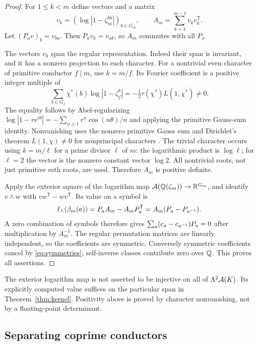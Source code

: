 \begin{proof}
For $1\le k<m$ define vectors and a matrix
\[
 v_k=(\log|1-\zeta_m^{bk}|)_{b\in G_m},
 \qquad A_m=\sum_{k=1}^{m-1}v_kv_k^{\mathsf T}.
\]
Let $(P_av)_b=v_{ba}$. Then $P_av_k=v_{ak}$, so $A_m$ commutes with
all $P_a$.

The vectors $v_k$ span the regular representation. Indeed their span
is invariant, and it has a nonzero projection to each character. For a
nontrivial even character of primitive conductor $f\mid m$, use
$k=m/f$. Its Fourier coefficient is a positive integer multiple of
\[
 \sum_{b\in G_f}\chi^*(b)\log|1-\zeta_f^b|
 =-\tfrac12\tau(\chi^*)L(1,\overline{\chi^*})\ne0.
\]
The equality follows by Abel-regularizing
$\log|1-r e^{i\theta}|=-\sum_{n\ge1}r^n\cos(n\theta)/n$ and applying
the primitive Gauss-sum identity. Nonvanishing uses the nonzero primitive
Gauss sum and Dirichlet's theorem $L(1,\chi)\ne0$ for nonprincipal
characters \cite[25.15.9]{DLMF}. The trivial character occurs using
$k=m/\ell$ for a prime divisor $\ell$ of $m$: the logarithmic product
is $\log\ell$; for $\ell=2$ the vector is the nonzero constant vector
$\log2$. All nontrivial roots, not just primitive $m$th roots, are used.
Therefore $A_m$ is positive definite.

Apply the exterior square of the logarithm map
$\mathcal A(\mathbb Q(\zeta_m))\to\mathbb R^{G_m}$, and identify $v\wedge w$ with
$vw^{\mathsf T}-wv^{\mathsf T}$. Its value on a symbol is
\begin{equation}\label{eq:skew-image}
 \ell_\wedge(\beta_m(a))
 =P_aA_m-A_mP_a^{\mathsf T}
 =A_m(P_a-P_{a^{-1}}).
\end{equation}
A zero combination of symbols therefore gives
$\sum_a(c_a-c_{a^{-1}})P_a=0$ after multiplication by $A_m^{-1}$.
The regular permutation matrices are linearly independent, so the
coefficients are symmetric. Conversely symmetric coefficients cancel
by \eqref{eq:symmetries}; self-inverse classes contribute zero over
$\mathbb Q$. This proves all assertions.
\end{proof}

\begin{remark}
The exterior logarithm map is not asserted to be injective on all of
$\Lambda^2\mathcal A(K)$. Its explicitly computed value suffices on the
particular span in Theorem~\ref{thm:kernel}. Positivity above is proved
by character nonvanishing, not by a floating-point determinant.
\end{remark}

\subsection{Separating coprime conductors}


